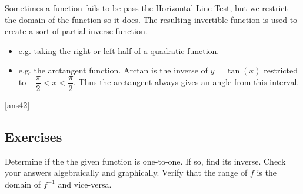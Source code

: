 \documentclass{amsbook}
\numberwithin{section}{chapter}
\numberwithin{equation}{chapter}
\newcommand{\qi}[1]{\begin{itemize}\item #1 \end{itemize}}
\begin{document}
Sometimes a function fails to be pass the Horizontal Line Test, but we restrict the domain of the function so it does. The resulting invertible function is used to create a sort-of partial inverse function.
\qi{e.g. taking the right or left half of a quadratic function.}
\qi{e.g. the arctangent function. Arctan is the inverse of $y=\tan(x)$ restricted to $-\dfrac{\pi}{2} < x < \dfrac{\pi}{2}$. Thus the arctangent always gives an angle from this interval.}


[ans42]
\subsection*{Exercises \nopunct} \hfill

Determine if the the given function is one-to-one. If so, find its inverse. Check your answers algebraically and graphically.  Verify that the range of $f$ is the domain of $f^{-1}$ and vice-versa.
\end{document}
